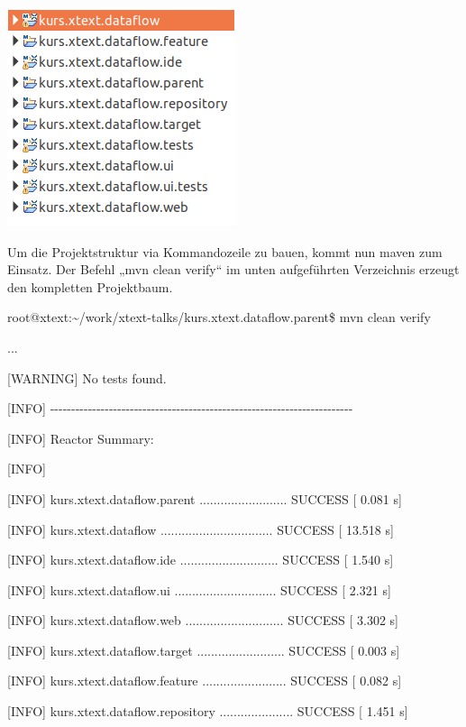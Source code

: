 \documentclass[a4]{article}
\begin{document}
\includegraphics[width=2.63540in,height=2.53110in]{./Pictures/10000201000000FD000000F33F19609DDE80FED7.png}

Um die Projektstruktur via Kommandozeile zu bauen, kommt nun maven zum
Einsatz. Der Befehl „mvn clean verify`` im unten aufgeführten
Verzeichnis erzeugt den kompletten Projektbaum.

root@xtext:\textasciitilde{}/work/xtext-talks/kurs.xtext.dataflow.parent\$
mvn clean verify

...

{[}WARNING{]} No tests found.

{[}INFO{]}
-\/-\/-\/-\/-\/-\/-\/-\/-\/-\/-\/-\/-\/-\/-\/-\/-\/-\/-\/-\/-\/-\/-\/-\/-\/-\/-\/-\/-\/-\/-\/-\/-\/-\/-\/-\/-\/-\/-\/-\/-\/-\/-\/-\/-\/-\/-\/-\/-\/-\/-\/-\/-\/-\/-\/-\/-\/-\/-\/-\/-\/-\/-\/-\/-\/-\/-\/-\/-\/-\/-\/-

{[}INFO{]} Reactor Summary:

{[}INFO{]}

{[}INFO{]} kurs.xtext.dataflow.parent ......................... SUCCESS
{[} 0.081 s{]}

{[}INFO{]} kurs.xtext.dataflow ................................ SUCCESS
{[} 13.518 s{]}

{[}INFO{]} kurs.xtext.dataflow.ide ............................ SUCCESS
{[} 1.540 s{]}

{[}INFO{]} kurs.xtext.dataflow.ui ............................. SUCCESS
{[} 2.321 s{]}

{[}INFO{]} kurs.xtext.dataflow.web ............................ SUCCESS
{[} 3.302 s{]}

{[}INFO{]} kurs.xtext.dataflow.target ......................... SUCCESS
{[} 0.003 s{]}

{[}INFO{]} kurs.xtext.dataflow.feature ........................ SUCCESS
{[} 0.082 s{]}

{[}INFO{]} kurs.xtext.dataflow.repository ..................... SUCCESS
{[} 1.451 s{]}
\end{document}
